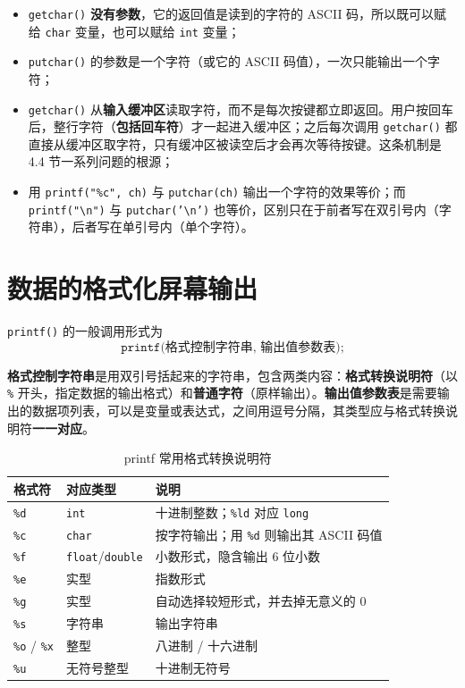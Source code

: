 \begin{itemize}
  \item \texttt{getchar()} \textbf{没有参数}，它的返回值是读到的字符的 ASCII 码，所以既可以赋给 \texttt{char} 变量，也可以赋给 \texttt{int} 变量；
  \item \texttt{putchar()} 的参数是一个字符（或它的 ASCII 码值），一次只能输出一个字符；
  \item \texttt{getchar()} 从\textbf{输入缓冲区}读取字符，而不是每次按键都立即返回。用户按回车后，整行字符（\textbf{包括回车符}）才一起进入缓冲区；之后每次调用 \texttt{getchar()} 都直接从缓冲区取字符，只有缓冲区被读空后才会再次等待按键。这条机制是 4.4 节一系列问题的根源；
  \item 用 \texttt{printf("\%c", ch)} 与 \texttt{putchar(ch)} 输出一个字符的效果等价；而 \texttt{printf("\textbackslash n")} 与 \texttt{putchar('\textbackslash n')} 也等价，区别只在于前者写在双引号内（字符串），后者写在单引号内（单个字符）。
\end{itemize}

\section{数据的格式化屏幕输出}

\texttt{printf()} 的一般调用形式为
\[
\texttt{printf(格式控制字符串,\ 输出值参数表);}
\]

\textbf{格式控制字符串}是用双引号括起来的字符串，包含两类内容：\textbf{格式转换说明符}（以 \texttt{\%} 开头，指定数据的输出格式）和\textbf{普通字符}（原样输出）。\textbf{输出值参数表}是需要输出的数据项列表，可以是变量或表达式，之间用逗号分隔，其类型应与格式转换说明符\textbf{一一对应}。

\begin{table}[htbp]
\centering
\caption{printf 常用格式转换说明符}
\small
\begin{tabularx}{\textwidth}{@{}llX@{}}
\toprule
格式符 & 对应类型 & 说明 \\
\midrule
\texttt{\%d} & \texttt{int} & 十进制整数；\texttt{\%ld} 对应 \texttt{long} \\
\texttt{\%c} & \texttt{char} & 按字符输出；用 \texttt{\%d} 则输出其 ASCII 码值 \\
\texttt{\%f} & \texttt{float}/\texttt{double} & 小数形式，隐含输出 6 位小数 \\
\texttt{\%e} & 实型 & 指数形式 \\
\texttt{\%g} & 实型 & 自动选择较短形式，并去掉无意义的 0 \\
\texttt{\%s} & 字符串 & 输出字符串 \\
\texttt{\%o} / \texttt{\%x} & 整型 & 八进制 / 十六进制 \\
\texttt{\%u} & 无符号整型 & 十进制无符号 \\
\bottomrule
\end{tabularx}
\end{table}

